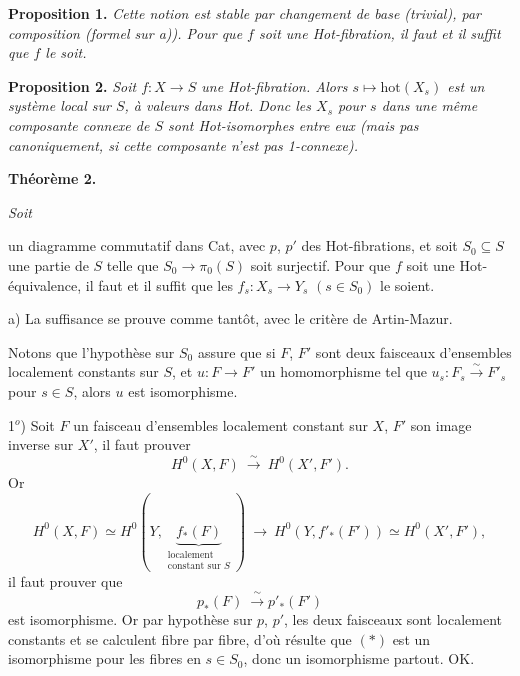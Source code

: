 \documentclass[11pt]{article}
\newcommand{\printedpage}[1]{\marginpar{\footnotesize p.~#1}}
\newcommand{\msp}[1]{\marginpar{\footnotesize [#1]}}
\begin{document}
\printedpage{4}

\textbf{Proposition 1.} \textit{Cette notion est stable par changement de base (trivial), par composition (formel sur a)). Pour que $f$ soit une \textup{Hot}-fibration, il faut et il suffit que $f$ le soit.}

\textbf{Proposition 2.} \textit{Soit $f : X \longrightarrow S$ une \textup{Hot}-fibration. Alors $s \longmapsto \mathrm{hot}(X_s)$ est un système local sur $S$, à valeurs dans \textup{Hot}. Donc les $X_s$ pour $s$ dans une même composante connexe de $S$ sont \textup{Hot}-isomorphes entre eux (mais pas canoniquement, si cette composante n'est pas \textup{1}-connexe).}

\textbf{Théorème 2.} {\itshape Soit
un diagramme commutatif dans \textup{Cat}, avec $p$, $p'$ des \textup{Hot}-fibrations, et soit $S_0 \subseteq S$ une partie de $S$ telle que $S_0 \longrightarrow \pi_0(S)$ soit surjectif. Pour que $f$ soit une \textup{Hot}-équivalence, il faut et il suffit que les $f_s : X_s \longrightarrow Y_s$ $(s \in S_0)$ le soient.} %

a) La suffisance se prouve comme tantôt, avec le critère de Artin-Mazur.

\msp{page 132}

Notons que l'hypothèse sur $S_0$ assure que si $F$, $F'$ sont deux faisceaux d'ensembles localement constants sur $S$, et $u : F \longrightarrow F'$ un homomorphisme tel que $u_s : F_s \xrightarrow{\ \sim\ } F'_s$ pour $s \in S$, alors $u$ est isomorphisme. %

1$^{o}$) Soit $F$ un faisceau d'ensembles localement constant sur $X$, $F'$ son image inverse sur $X'$, il faut prouver
\[
H^0(X,F) \ \xrightarrow{\ \sim\ }\ H^0(X',F').
\]
Or
\[
H^0(X,F) \simeq H^0(Y, \underbrace{f_*(F)}_{\substack{\text{localement}\\ \text{constant sur } S}}) \ \longrightarrow\ H^0(Y, f'_*(F')) \simeq H^0(X',F'),
\] %
il faut prouver que
\[
p_*(F) \ \xrightarrow{\ \sim\ } p'_*(F') \tag*{$(*)$}
\]
est isomorphisme. Or par hypothèse sur $p$, $p'$, les deux faisceaux sont localement constants et se calculent fibre par fibre, d'où résulte que $(*)$ est un isomorphisme pour les fibres en $s \in S_0$, donc un isomorphisme partout. OK.
\end{document}

